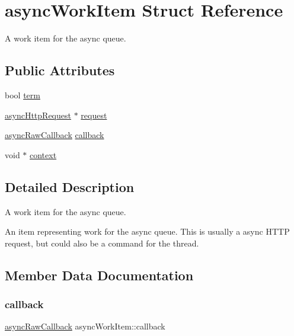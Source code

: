 \hypertarget{structasyncWorkItem}{}\section{async\+Work\+Item Struct Reference}
\label{structasyncWorkItem}


A work item for the async queue.  


\subsection*{Public Attributes}
\begin{DoxyCompactItemize}
\item 
bool \hyperlink{structasyncWorkItem_a3acc23abec3617d1cbdd4b3a2f577612}{term}
\item 
\hyperlink{redfishRawAsync_8h_a18894e379815e825467bd6e13802b07b}{async\+Http\+Request} $\ast$ \hyperlink{structasyncWorkItem_a80945057b42102b7ef5eb7a4b88f90ed}{request}
\item 
\hyperlink{redfishRawAsync_8h_a0fe5b4a806033e1fcf0cbc4b2b53953f}{async\+Raw\+Callback} \hyperlink{structasyncWorkItem_ade1bb27c87ca58f9d8cebd7f5a377f28}{callback}
\item 
void $\ast$ \hyperlink{structasyncWorkItem_a06379c9a4a8594373d5ffd9c0ab1af44}{context}
\end{DoxyCompactItemize}


\subsection{Detailed Description}
A work item for the async queue. 

An item representing work for the async queue. This is usually a async H\+T\+TP request, but could also be a command for the thread. 

\subsection{Member Data Documentation}
\mbox{\label{structasyncWorkItem_ade1bb27c87ca58f9d8cebd7f5a377f28}} 
\subsubsection{\texorpdfstring{callback}{callback}}
{\footnotesize\ttfamily \hyperlink{redfishRawAsync_8h_a0fe5b4a806033e1fcf0cbc4b2b53953f}{async\+Raw\+Callback} async\+Work\+Item\+::callback}

